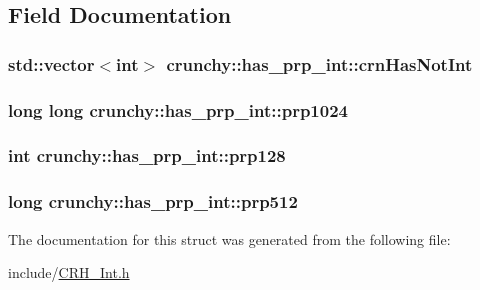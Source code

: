 \subsection{Field Documentation}
\subsubsection[{crn\+Has\+Not\+Int}]{\setlength{\rightskip}{0pt plus 5cm}std\+::vector$<$int$>$ crunchy\+::has\+\_\+prp\+\_\+int\+::crn\+Has\+Not\+Int}\hypertarget{structcrunchy_1_1has__prp__int_aad3a0422efea97f7b9bee027cfcb52db}{}\label{structcrunchy_1_1has__prp__int_aad3a0422efea97f7b9bee027cfcb52db}
\subsubsection[{prp1024}]{\setlength{\rightskip}{0pt plus 5cm}long long crunchy\+::has\+\_\+prp\+\_\+int\+::prp1024\hspace{0.3cm}{\ttfamily [static]}}\hypertarget{structcrunchy_1_1has__prp__int_ace46d5f0b237274c2e320ce7c5a36d79}{}\label{structcrunchy_1_1has__prp__int_ace46d5f0b237274c2e320ce7c5a36d79}
\subsubsection[{prp128}]{\setlength{\rightskip}{0pt plus 5cm}int crunchy\+::has\+\_\+prp\+\_\+int\+::prp128\hspace{0.3cm}{\ttfamily [static]}}\hypertarget{structcrunchy_1_1has__prp__int_a0cd751991192d1399da3d87e53ee6107}{}\label{structcrunchy_1_1has__prp__int_a0cd751991192d1399da3d87e53ee6107}
\subsubsection[{prp512}]{\setlength{\rightskip}{0pt plus 5cm}long crunchy\+::has\+\_\+prp\+\_\+int\+::prp512\hspace{0.3cm}{\ttfamily [static]}}\hypertarget{structcrunchy_1_1has__prp__int_a0d4a6dff87f95d843e28ea7370bef23f}{}\label{structcrunchy_1_1has__prp__int_a0d4a6dff87f95d843e28ea7370bef23f}


The documentation for this struct was generated from the following file\+:\begin{DoxyCompactItemize}
\item 
include/\hyperlink{_c_r_h___int_8h}{C\+R\+H\+\_\+\+Int.\+h}\end{DoxyCompactItemize}
